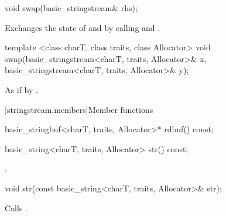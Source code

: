 %
\begin{itemdecl}
void swap(basic_stringstream& rhs);
\end{itemdecl}

\begin{itemdescr}
\pnum
\effects Exchanges the state of  and
 by calling
 and
.
\end{itemdescr}


%
\begin{itemdecl}
template <class charT, class traits, class Allocator>
  void swap(basic_stringstream<charT, traits, Allocator>& x,
            basic_stringstream<charT, traits, Allocator>& y);
\end{itemdecl}

\begin{itemdescr}
\pnum
\effects As if by .
\end{itemdescr}

[stringstream.members]{Member functions}

%
\begin{itemdecl}
basic_stringbuf<charT, traits, Allocator>* rdbuf() const;
\end{itemdecl}

\begin{itemdescr}
\pnum
\returns
{}
\end{itemdescr}

%
\begin{itemdecl}
basic_string<charT, traits, Allocator> str() const;
\end{itemdecl}

\begin{itemdescr}
\pnum
\returns
{}.
\end{itemdescr}

%
\begin{itemdecl}
void str(const basic_string<charT, traits, Allocator>& str);
\end{itemdecl}

\begin{itemdescr}
\pnum
\effects
Calls
.
\end{itemdescr}


